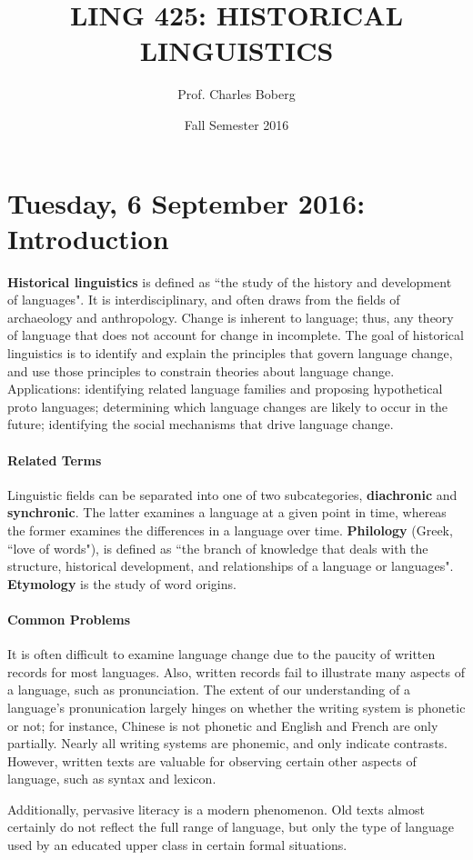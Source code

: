 \documentclass{exam}
\title{LING 425: HISTORICAL LINGUISTICS}
\date{Fall Semester 2016}
\author{Prof. Charles Boberg}
\begin{document}
\pagestyle{fancy}
\fancyhf{}

\maketitle



\section*{Tuesday, 6 September 2016: Introduction}

\noindent \textbf{Historical linguistics} is defined as ``the study of the history and development of languages". It is interdisciplinary, and often draws from the fields of archaeology and anthropology. Change is inherent to language; thus, any theory of language that does not account for change in incomplete. The goal of historical linguistics is to identify and explain the principles that govern language change, and use those principles to constrain theories about language change. Applications: identifying related language families and proposing hypothetical proto languages; determining which language changes are likely to occur in the future; identifying the social mechanisms that drive language change.
\fancyfoot[C]{\thepage}


\paragraph{Related Terms} Linguistic fields can be separated into one of two subcategories, \textbf{diachronic} and \textbf{synchronic}. The latter examines a language at a given point in time, whereas the former examines the differences in a language over time. \textbf{Philology} (Greek, ``love of words"), is defined as ``the branch of knowledge that deals with the structure, historical development, and relationships of a language or languages". \textbf{Etymology} is the study of word origins. \par
 


\paragraph{Common Problems} It is often difficult to examine language change due to the paucity of written records for most languages. Also, written records fail to illustrate many aspects of a language, such as pronunciation. The extent of our understanding of a language's pronunication largely hinges on whether the writing system is phonetic or not; for instance, Chinese is not phonetic and English and French are only partially. Nearly all writing systems are phonemic, and only indicate contrasts. However, written texts are valuable for observing certain other aspects of language, such as syntax and lexicon. \par Additionally, pervasive literacy is a modern phenomenon. Old texts almost certainly do not reflect the full range of language, but only the type of language used by an educated upper class in certain formal situations. 
\end{document}
